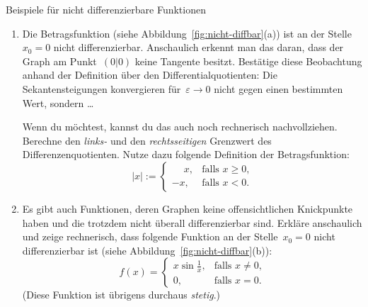 \documentclass[twoside]{../zirkelblatt}
\theoremstyle{definition}
\theoremstyle{plain}
\theoremstyle{remark}
\begin{document}
\begin{aufgabeShaded}{Beispiele für nicht differenzierbare Funktionen}
\label{aufg:nichtdb}
\begin{enumerate}
\item Die Betragsfunktion (siehe Abbildung~\ref{fig:nicht-diffbar}(a)) ist an der
Stelle~$x_0 = 0$ nicht differenzierbar. Anschaulich erkennt man das daran, dass
der Graph am Punkt~$(0|0)$ keine Tangente besitzt.\footnotemark{}
Bestätige diese Beobachtung anhand der Definition über den
Differentialquotienten: Die Sekantensteigungen konvergieren für~$\varepsilon
\to 0$ nicht gegen einen bestimmten Wert, sondern \ldots

Wenn du möchtest, kannst du das auch noch rechnerisch nachvollziehen. Berechne
den \emph{links-} und den \emph{rechtsseitigen} Grenzwert des
Differenzenquotienten. Nutze dazu folgende Definition der Betragsfunktion:
\[ |x| := \begin{cases}\phantom{-}x, & \text{falls $x \geq 0$,} \\ -x, & \text{falls $x <
0$.}\end{cases} \]
\item Es gibt auch Funktionen, deren Graphen keine offensichtlichen
Knickpunkte haben und die trotzdem nicht überall differenzierbar sind. Erkläre
anschaulich und zeige rechnerisch, dass folgende Funktion an der Stelle~$x_0 =
0$ nicht differenzierbar ist (siehe Abbildung~\ref{fig:nicht-diffbar}(b)):
\[ f(x) = \begin{cases}x \sin\frac{1}{x}, & \text{falls $x \neq 0$,} \\
0, & \text{falls $x = 0$.}\end{cases} \]
(Diese Funktion ist übrigens durchaus \emph{stetig}.)
\end{enumerate}
\end{aufgabeShaded}
\end{document}
